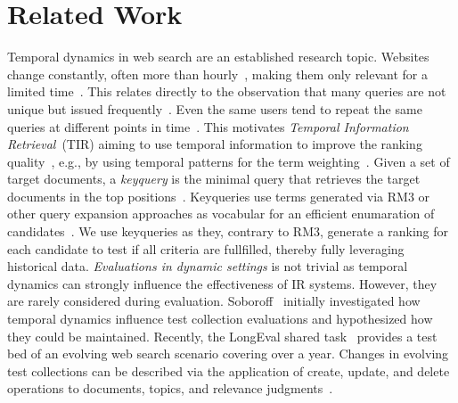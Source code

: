 \section{Related Work}
\label{sec:related-work}

Temporal dynamics in web search are an established research topic. Websites change constantly, often more than hourly~\cite{DBLP:conf/wsdm/AdarTDE09}, making them only relevant for a limited time~\cite{DBLP:conf/sigir/TikhonovBBOKG13}. This relates directly to the observation that many queries are not unique but issued frequently~\cite{DBLP:conf/sigir/Dumais14,DBLP:journals/sigir/SilversteinHMM99}. Even the same users tend to repeat the same queries at different points in time~\cite{DBLP:conf/wsdm/TylerT10}.
This motivates \emph{Temporal Information Retrieval}~(TIR) aiming to use temporal information to improve the ranking quality~\cite{DBLP:journals/ftir/KanhabuaBN15,DBLP:journals/csur/CamposDJJ14}, e.g., by using temporal patterns for the term weighting~\cite{DBLP:conf/wsdm/ElsasD10}.
Given a set of target documents, a \emph{keyquery} is the minimal query that retrieves the target documents in the top positions~\cite{gollub:2013a,hagen:2016b}. Keyqueries use terms generated via RM3 or other query expansion approaches as vocabular for an efficient enumaration of candidates~\cite{froebe:2022c,froebe:2021c}. We use keyqueries as they, contrary to RM3, generate a ranking for each candidate to test if all criteria are fullfilled, thereby fully leveraging historical data.
\emph{Evaluations in dynamic settings} is not trivial as temporal dynamics can strongly influence the effectiveness of IR systems. However, they are rarely  considered during evaluation. Soboroff~\cite{DBLP:conf/sigir/Soboroff06} initially investigated how temporal dynamics influence test collection evaluations and hypothesized how they could be maintained. Recently, the LongEval shared task~\cite{DBLP:conf/clef/AlkhalifaBDEAFG24,alkhalifa:2023} provides a test bed of an evolving web search scenario covering over a year. Changes in evolving test collections can be described via the application of create, update, and delete operations to documents, topics, and relevance judgments~\cite{keller:2024}.
